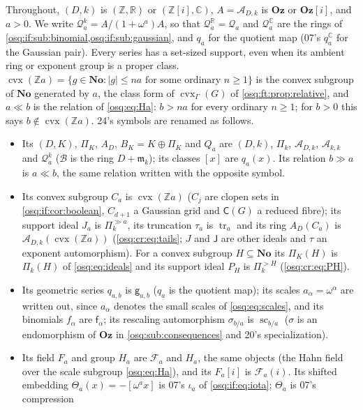\documentclass[11pt,letterpaper]{article}
\numberwithin{equation}{section}
\theoremstyle{definition}
\theoremstyle{remark}
\theoremstyle{plain}
\newcommand{\No}{\mathbf{No}}
\newcommand{\Oz}{\mathbf{Oz}}
\newcommand{\GOz}{\Oz[i]}
\newcommand{\Z}{\mathbb Z}
\newcommand{\R}{\mathbb R}
\newcommand{\C}{\mathbb C}
\newcommand{\A}{\mathcal A}          %
\newcommand{\B}{\mathcal B}          %
\newcommand{\mm}{\mathfrak m}        %
\newcommand{\FF}{\mathscr F}         %
\newcommand{\Qa}{\mathcal Q}         %
\begin{document}
Throughout, $(D,k)$ is $(\Z,\R)$ or $(\Z[i],\C)$, $A=\A_{D,k}$ is $\Oz$ or $\GOz$, and $a>0$. We write $\Qa_a^k=A/(1+\omega^a)A$, so that
$\Qa_a^\R=\Qa_a$ and $\Qa_a^\C$ are the rings of \cref{osq:if:sub:binomial,osq:if:sub:gaussian}, and $q_a$ for the quotient map (07's $q_a^\C$ for the
Gaussian pair). Every series has a set-sized support, even when its ambient ring or exponent group is a proper class. $\operatorname{cvx}(\Z a)=\{g\in\No:
|g|\le na\text{ for some ordinary }n\ge1\}$ is the convex subgroup of $\No$ generated by $a$, the class form of $\operatorname{cvx}_\Gamma(G)$ of
\cref{osq:ft:prop:relative}, and $a\ll b$ is the relation of \eqref{osq:eq:Ha}: $b>na$ for every ordinary $n\ge1$; for $b>0$ this says $b\notin
\operatorname{cvx}(\Z a)$. 24's symbols are renamed as follows.
\begin{itemize}
\item Its $(D,K)$, $\Pi_K$, $A_D$, $B_K=K\oplus\Pi_K$ and $Q_a$ are $(D,k)$, $\Pi_k$, $\A_{D,k}$, $\A_{k,k}$ and $\Qa^k_a$ ($\B$ is the ring $D+\mm_k$);
its classes $[x]$ are $q_a(x)$. Its relation $b\gg a$ is $a\ll b$, the same relation written with the opposite symbol.
\item Its convex subgroup $C_a$ is $\operatorname{cvx}(\Z a)$ ($C_j$ are clopen sets in \cref{osq:if:cor:boolean}, $C_{d+1}$ a Gaussian grid and
$\mathsf C(G)$ a reduced fibre); its support ideal $J_a$ is $\Pi_k^{\gg a}$, its truncation $\tau_a$ is $\operatorname{tr}_a$ and its ring $A_D(C_a)$ is
$\A_{D,k}(\operatorname{cvx}(\Z a))$ (\eqref{osq:cr:eq:tails}; $J$ and $\mathsf J$ are other ideals and $\tau$ an exponent automorphism). For a convex
subgroup $H\subseteq\No$ its $\Pi_K(H)$ is $\Pi_k(H)$ of \eqref{osq:eq:ideals} and its support ideal $P_H$ is $\Pi_k^{>H}$ (\eqref{osq:cr:eq:PH}).
\item Its geometric series $q_{a,b}$ is $\mathsf g_{a,b}$ ($q_a$ is the quotient map); its scales $a_\alpha=\omega^\alpha$ are written out, since
$a_\alpha$ denotes the small scales of \eqref{osq:eq:scales}, and its binomials $f_\alpha$ are $\mathsf f_\alpha$; its rescaling automorphism $\sigma_{b/a}$ is
$\operatorname{sc}_{b/a}$ ($\sigma$ is an endomorphism of $\Oz$ in \cref{osq:sub:consequences} and 20's specialization).
\item Its field $F_a$ and group $H_a$ are $\FF_a$ and $H_a$, the same objects (the Hahn field over the scale subgroup \eqref{osq:eq:Ha}), and its
$F_a[i]$ is $\FF_a(i)$. Its shifted embedding $\Theta_a(x)=-[\omega^ax]$ is 07's $\iota_a$ of \eqref{osq:if:eq:iota}; $\Theta_a$ is 07's compression

\end{itemize}
\end{document}
